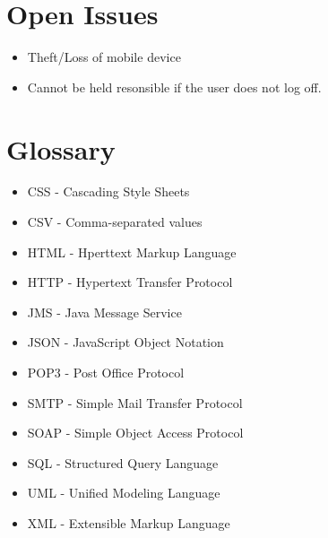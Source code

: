 \documentclass[12pt]{article}
\begin{document}
 \section{Open Issues}
\begin{itemize}
  \item Theft/Loss of mobile device
  \item Cannot be held resonsible if the user does not log off.
\end{itemize}
 \section{Glossary} 
 \begin{itemize}
  \item CSS - Cascading Style Sheets
  \item CSV - Comma-separated values
  \item HTML - Hperttext Markup Language
  \item HTTP - Hypertext Transfer Protocol
  \item JMS - Java Message Service
  \item JSON - JavaScript Object Notation
  \item POP3 - Post Office Protocol 
  \item SMTP - Simple Mail Transfer Protocol
  \item SOAP - Simple Object Access Protocol  
  \item SQL - Structured Query Language
  \item UML - Unified Modeling Language
  \item XML - Extensible Markup Language
\end{itemize}
\end{document}
